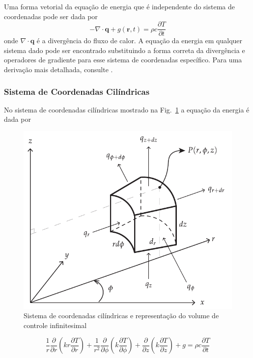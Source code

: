 Uma forma vetorial da equação de energia que é independente do sistema de coordenadas pode ser dada por
\begin{equation}\label{eq:Fourier}
		- \nabla \cdot \mathbf{q} + g(\mathbf{r},t) = \rho c \frac {\partial T} {\partial t}
\end{equation}
onde $\nabla \cdot \mathbf{q}$ é a divergência do fluxo de calor. A equação da energia em qualquer sistema dado pode ser encontrado substituindo a forma correta da divergência e operadores de gradiente para esse sistema de coordenadas específico. Para uma derivação mais detalhada, consulte \textcite[p. 36]{ozisik1993}.

\subsubsection{Sistema de Coordenadas Cilíndricas}
	
No sistema de coordenadas cilíndricas mostrado na Fig.~\ref{fig:coordCilindricas} a equação da energia é dada por
	
\begin{figure}[ht]
	\centering
	\includegraphics[scale=.9]{figuras/cap1/coordenadasCilindricas.pdf}
	\caption{Sistema de coordenadas cilíndricas e representação do volume de controle  infinitesimal}
	\label{fig:coordCilindricas}
\end{figure}
\begin{equation}\label{eq3Dcila}
	\frac{1}{r}	\frac{\partial}{\partial r} \left(kr\frac{\partial T}{\partial r}\right) +
	\frac{1}{r^2} \frac{\partial}{\partial \phi} \left(k\frac{\partial T}{\partial \phi}\right) + \frac{\partial}{\partial z}\left(k\frac{\partial T}{\partial z}\right) + g = 
	\rho c \frac{\partial T}{\partial t}  
\end{equation}	
	
